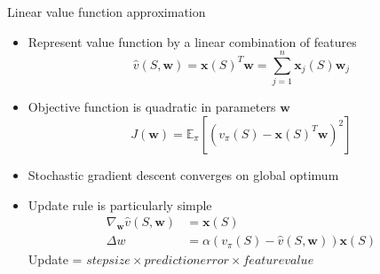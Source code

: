 \bgroup
\begin{frame}{Linear value function approximation}
\begin{itemize}
\item Represent value function by a linear combination of features
\begin{equation*}
\hat{v}(S,\textbf{w}) = \textbf{x}(S)^T\textbf{w} = \sum_{j=1}^n\textbf{x}_j(S)\textbf{w}_j
\end{equation*}
\item Objective function is quadratic in parameters $\textbf{w}$
\begin{equation*}
J(\textbf{w}) = \mathbb{E}_{\pi}[(v_{\pi}(S) - \textbf{x}(S)^T\textbf{w})^2]
\end{equation*}
\item Stochastic gradient descent converges on global optimum
\item Update rule is particularly simple
\begin{align*}
\nabla_{\textbf{w}}\hat{v}(S,\textbf{w}) &= \textbf{x}(S)\\
\Delta w &= \alpha(v_{\pi}(S) - \hat{v}(S,\textbf{w}))\textbf{x}(S)
\end{align*}
Update = $stepsize \times prediction error \times feature value$
\end{itemize}
\end{frame}
\egroup